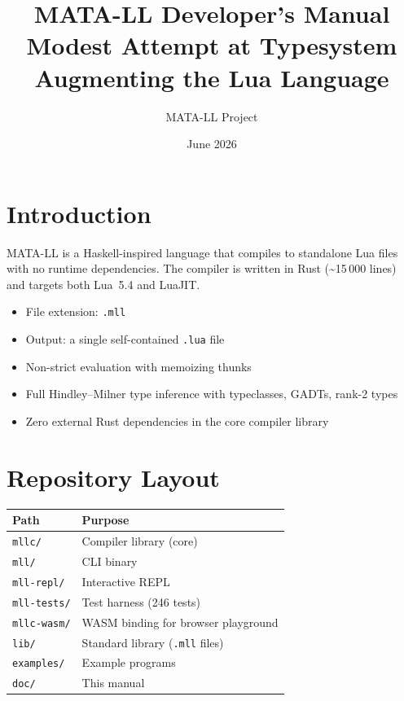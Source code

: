 \documentclass[11pt,a4paper]{article}
\title{\textbf{MATA-LL Developer's Manual}\\[6pt]
  \large Modest Attempt at Typesystem Augmenting the Lua Language}
\author{MATA-LL Project}
\date{June 2026}
\begin{document}
\maketitle
\tableofcontents
\clearpage

\section{Introduction}

MATA-LL is a Haskell-inspired language that compiles to standalone Lua files with
no runtime dependencies.  The compiler is written in Rust (\textasciitilde15\,000
lines) and targets both Lua~5.4 and LuaJIT.

\begin{itemize}[nosep]
  \item File extension: \texttt{.mll}
  \item Output: a single self-contained \texttt{.lua} file
  \item Non-strict evaluation with memoizing thunks
  \item Full Hindley--Milner type inference with typeclasses, GADTs, rank-2 types
  \item Zero external Rust dependencies in the core compiler library
\end{itemize}

\section{Repository Layout}

\begin{tabular}{@{}ll@{}}
\toprule
\textbf{Path} & \textbf{Purpose} \\
\midrule
\texttt{mllc/}       & Compiler library (core) \\
\texttt{mll/}        & CLI binary \\
\texttt{mll-repl/}   & Interactive REPL \\
\texttt{mll-tests/}  & Test harness (246 tests) \\
\texttt{mllc-wasm/}  & WASM binding for browser playground \\
\texttt{lib/}        & Standard library (\texttt{.mll} files) \\
\texttt{examples/}   & Example programs \\
\texttt{doc/}        & This manual \\
\bottomrule
\end{tabular}
\end{document}
